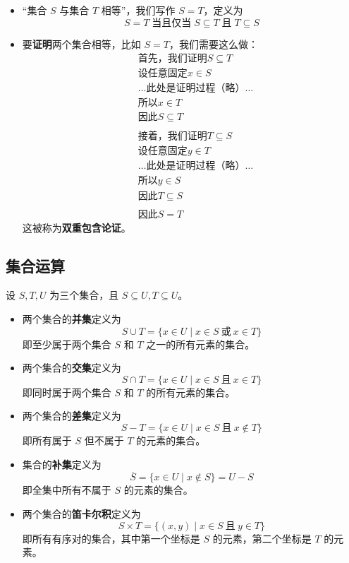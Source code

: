 \begin{itemize}
    \item ``集合 $S$ 与集合 $T$ 相等''，我们写作 $S=T$，定义为
        \[S = T \;\text{当且仅当}\; S \subseteq T \;\text{且}\; T \subseteq S\]
    \item 要\textbf{证明}两个集合相等，比如 $S=T$，我们需要这么做：
        \begin{align*}
            &\text{首先，我们证明}S \subseteq T\\
            &\text{设任意固定} x \in S \\
            &\dots \text{此处是证明过程（略）}\dots\\
            &\text{所以}x \in T\\
            &\text{因此}S \subseteq T\\
            \\
            &\text{接着，我们证明}T \subseteq S\\
            &\text{设任意固定} y \in T \\
            &\dots \text{此处是证明过程（略）}\dots\\
            &\text{所以}y \in S\\
            &\text{因此}T \subseteq S\\
            \\
            &\text{因此}S = T
        \end{align*}
        这被称为\textbf{双重包含论证}。
\end{itemize}

\subsection{集合运算}

设 $S,T,U$ 为三个集合，且 $S \subseteq U, T \subseteq U$。

\begin{itemize}
    \item 两个集合的\textbf{并集}定义为
        \[ S \cup T = \{x \in U \mid x \in S \:\text{或}\: x \in T\}\]
        即至少属于两个集合 $S$ 和 $T$ 之一的所有元素的集合。
    \item 两个集合的\textbf{交集}定义为
        \[S \cap T = \{x \in U \mid x \in S \:\text{且}\: x \in T\}\]
        即同时属于两个集合 $S$ 和 $T$ 的所有元素的集合。
    \item 两个集合的\textbf{差集}定义为
        \[S - T = \{x \in U \mid x \in S \:\text{且}\: x \notin T\}\]
        即所有属于 $S$ 但不属于 $T$ 的元素的集合。
    \item 集合的\textbf{补集}定义为
        \[\overline{S} = \{x\in U \mid x \notin S\}=U-S\]
        即全集中所有不属于 $S$ 的元素的集合。
    \item 两个集合的\textbf{笛卡尔积}定义为
        \[S \times T = \{(x,y) \mid x \in S \:\text{且}\: y \in T\}\]
        即所有有序对的集合，其中第一个坐标是 $S$ 的元素，第二个坐标是 $T$ 的元素。
\end{itemize}

